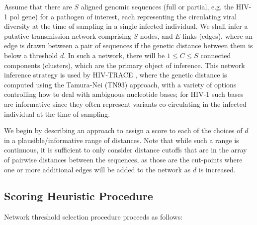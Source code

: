 \documentclass[utf8]{FrontiersinHarvard} %
\newcommand{\TODO}[1]{{\color{red}{#1}}}
\begin{document}
Assume that there are $S$ aligned genomic sequences (full or partial, e.g. the HIV-1 pol gene) for a pathogen of interest, each representing the circulating viral diversity at the time of sampling in a single infected individual.
We shall infer a putative transmission network comprising $S$ nodes, and $E$ links (edges), where an edge is drawn between a pair of sequences if the genetic distance between them is below a threshold $d$. In such a network, there will be $1\leq C \leq S$ connected components (clusters), which are the primary object of inference. This network inference strategy is used by HIV-TRACE \TODO{add reference}, where the genetic distance is computed using the Tamura-Nei (TN93) \TODO{add reference} approach, with a variety of options controlling how to deal with ambiguous nucleotide bases; for HIV-1 such bases are informative since they often represent variants co-circulating in the infected individual at the time of sampling. 

We begin by describing an approach to assign a score to each of the choices of $d$ in a plausible/informative range of distances. Note that while such a range is continuous, it is sufficient to only consider distance cutoffs that are in the array of pairwise distances between the sequences, as those are the cut-points where one or more additional edges will be added to the network as $d$ is increased.

\subsection{Scoring Heuristic Procedure}

Network threshold selection procedure proceeds as follows:
\end{document}

